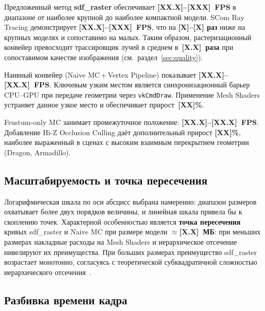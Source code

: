 Предложенный метод \textbf{sdf\_raster} обеспечивает
\textbf{[XX.X]--[XXX]~FPS} в диапазоне от наиболее крупной до наиболее
компактной модели. SCom Ray Tracing демонстрирует \textbf{[XX.X]--[XXX]~FPS},
что на \textbf{[X]--[X] раз} ниже на крупных моделях и сопоставимо на малых.
Таким образом, растеризационный конвейер превосходит трассировщик лучей
в среднем в~\textbf{[X.X]~раза} при сопоставимом качестве изображения
(см.\ раздел~\ref{sec:quality}).

Наивный конвейер (Naive MC\,+\,Vertex Pipeline) показывает
\textbf{[XX.X]--[XX.X]~FPS}. Ключевым узким местом является
синхронизационный барьер CPU--GPU при передаче геометрии через
\texttt{vkCmdDraw}. Применение Mesh Shaders устраняет данное узкое место
и обеспечивает прирост~\textbf{[XX]\%}.

Frustum-only MC занимает промежуточное положение:
\textbf{[XX.X]--[XX.X]~FPS}.
Добавление Hi-Z Occlusion Culling даёт дополнительный прирост
\textbf{[XX]\%}, наиболее выраженный в сценах с высоким взаимным
перекрытием геометрии (Dragon, Armadillo).

\subsection{Масштабируемость и точка пересечения}

Логарифмическая шкала по оси абсцисс выбрана намеренно: диапазон размеров
охватывает более двух порядков величины, и линейная шкала привела бы к
скоплению точек. Характерной особенностью является \textbf{точка пересечения}
кривых sdf\_raster и Naive MC при размере модели ${\approx}$\textbf{[X.X]~МБ}:
при меньших размерах накладные расходы на Mesh Shaders и иерархическое
отсечение нивелируют их преимущества. При больших размерах преимущество
sdf\_raster возрастает монотонно, согласуясь с теоретической
субквадратичной сложностью иерархического отсечения~\cite{greene1993hier}.

\subsection{Разбивка времени кадра}

